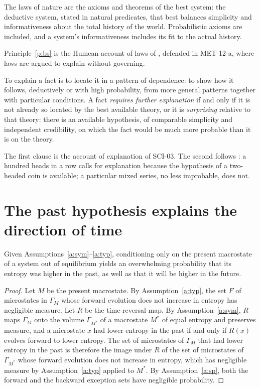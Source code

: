 \documentclass{situationist-preprint}
\begin{document}
\begin{principle}\label{p:bs}
The laws of nature are the axioms and theorems of the best system: the deductive system, stated in natural predicates, that best balances simplicity and informativeness about the total history of the world. Probabilistic axioms are included, and a system's informativeness includes its fit to the actual history.
\end{principle}

Principle~\ref{p:bs} is the Humean account of laws of \citet{Lewis1994}, defended in MET-12-a, where laws are argued to explain without governing.

\begin{principle}[Explanation]\label{p:expl}
To explain a fact is to locate it in a pattern of dependence: to show how it follows, deductively or with high probability, from more general patterns together with particular conditions. A fact \emph{requires further explanation} if and only if it is not already so located by the best available theory, or it is \emph{surprising} relative to that theory: there is an available hypothesis, of comparable simplicity and independent credibility, on which the fact would be much more probable than it is on the theory.
\end{principle}

The first clause is the account of explanation of SCI-03. The second follows \citet{Horwich1982}: a hundred heads in a row calls for explanation because the hypothesis of a two-headed coin is available; a particular mixed series, no less improbable, does not.

\section{The past hypothesis explains the direction of time}\label{s:arrow}

\begin{lemma}[Reversibility]\label{l:rev}
Given Assumptions~\ref{a:sym}--\ref{a:typ}, conditioning only on the present macrostate of a system out of equilibrium yields an overwhelming probability that its entropy was higher in the past, as well as that it will be higher in the future.
\end{lemma}

\begin{proof}
Let $M$ be the present macrostate. By Assumption~\ref{a:typ}, the set $F$ of microstates in $\Gamma_M$ whose forward evolution does not increase in entropy has negligible measure. Let $R$ be the time-reversal map. By Assumption~\ref{a:sym}, $R$ maps $\Gamma_M$ onto the volume $\Gamma_{M^*}$ of a macrostate $M^*$ of equal entropy and preserves measure, and a microstate $x$ had lower entropy in the past if and only if $R(x)$ evolves forward to lower entropy. The set of microstates of $\Gamma_{M}$ that had lower entropy in the past is therefore the image under $R$ of the set of microstates of $\Gamma_{M^*}$ whose forward evolution does not increase in entropy, which has negligible measure by Assumption~\ref{a:typ} applied to $M^*$. By Assumption~\ref{a:sp}, both the forward and the backward exception sets have negligible probability.
\end{proof}
\end{document}
